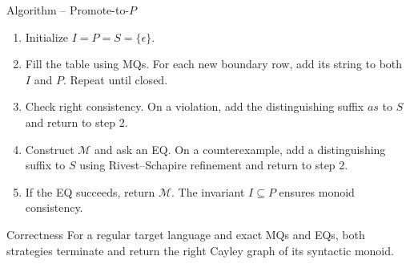 \documentclass{beamer}
\begin{document}
\begin{frame}{Algorithm -- Promote-to-$P$}
    \begin{enumerate}
        \item Initialize $I=P=S=\{\epsilon\}$.
        \item Fill the table using MQs. For each new boundary row,
        add its string to both $I$ and $P$. Repeat until closed.
        \item Check right consistency. On a violation, add the distinguishing
        suffix $as$ to $S$ and return to step 2.
        \item Construct $\mathcal{M}$ and ask an EQ.
        On a counterexample, add a distinguishing suffix to $S$
        using Rivest--Schapire refinement and return to step 2.
        \item If the EQ succeeds, return $\mathcal{M}$.
        The invariant $I\subseteq P$ ensures monoid consistency.
    \end{enumerate}
    \begin{alertblock}{Correctness}
        For a regular target language and exact MQs and EQs,
        both strategies terminate and return the right Cayley graph
        of its syntactic monoid.
    \end{alertblock}
\end{frame}
\end{document}
